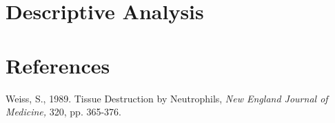\documentclass[10.5pt]{report}
\begin{document}
\section*{Descriptive Analysis}

\begin{comment}
    Report requirements:
    - Define all notation
    - Include descriptions of tables, figures
    - Take writing to UTA Writing Center
    
    Includes:
    - Cover page
    - - Complete, includes nec. info 
    - Data section
    - - Describe data collection process
    - - - Enough info for someone to replicate process
    - Descriptive Statistics
    - - Include results from descriptive analysis
    - - Interpret results of:
    - - - Box-and-whisker plot
    - - - Histogram
    - - Do sets follow distributions? 1/2 = normal/exponential dist?
    - Appendices I/II:
    - - Tables of raw data for each set
    - - Code
    - - Equipment used
    
    Structure:
    - cover
    - table of contents
    - body
    - - motivation
    - - the data 
    - - collection process
    - - descriptive statistics
    - - methodologies
    - - - tech used (reference appendece for code/tech used)
    - - results 
    - - - figs
    - - answer questions
    - appendices
    - - 1 - set 1 data
    - - 2 - set 2 data
    - - 3 - main analysis code
    - - 4 - helper / preprocessing
    - - 5 - table of equipment

\end{comment}



\newpage
\section*{References}

Weiss, S., 1989. Tissue Destruction by Neutrophils, \textit{New England Journal of Medicine,} 320, pp. 365-376.
\newline
\newline
\end{document}
